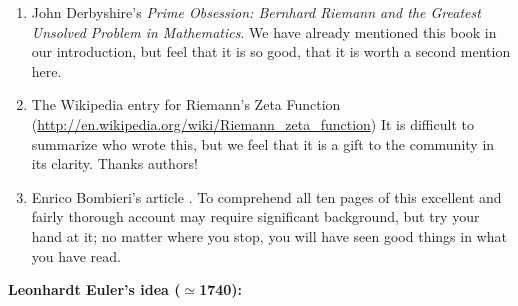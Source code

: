 \documentclass[openany]{book}
\theoremstyle{plain}
\theoremstyle{definition}
\begin{document}
{{ \begin{enumerate}
 \item John Derbyshire's {\it Prime Obsession: Bernhard Riemann and
     the Greatest Unsolved Problem in Mathematics}.  We have already
   mentioned this book in our introduction, but feel that it is so
   good, that it is worth a second mention here.
 \item The Wikipedia entry for Riemann's Zeta Function
   (\url{http://en.wikipedia.org/wiki/Riemann\_zeta\_function}) It is
   difficult to summarize who wrote this, but we feel that it is a
   gift to the community in its clarity. Thanks authors!
 \item Enrico Bombieri's article .
   To comprehend all ten pages of this excellent and fairly thorough
   account may require significant background, but try your hand at
   it; no matter where you stop, you will have seen good things in
   what you have read.
\end{enumerate}
\vskip20pt
{\bf Leonhardt Euler's idea ($\simeq$1740):}

}}
\end{document}
